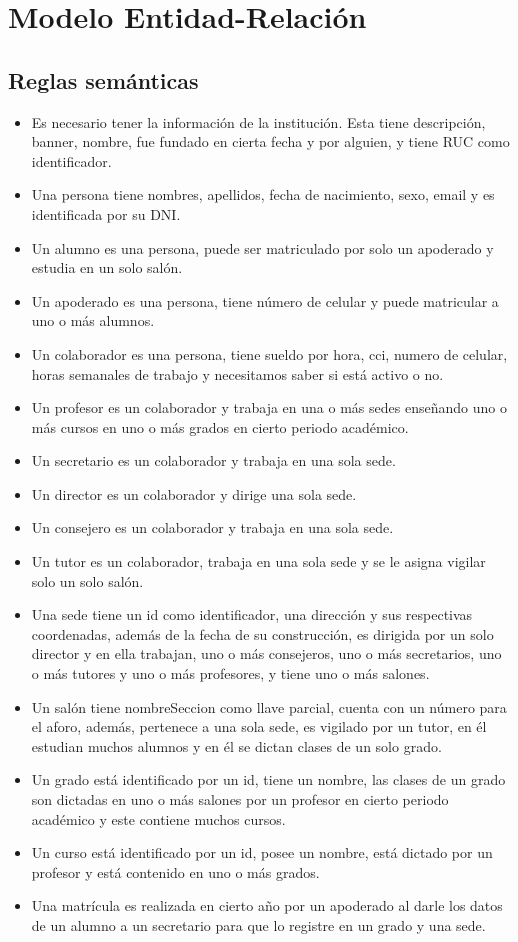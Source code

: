 \section{Modelo Entidad-Relación}
\subsection{Reglas semánticas}
\begin{itemize}
	\item Es necesario tener la información de la institución. Esta tiene descripción, banner, nombre, fue fundado en cierta fecha y por alguien, y tiene RUC como identificador.
	\item Una persona tiene nombres, apellidos, fecha de nacimiento, sexo, email y es identificada por su DNI.
	\item Un alumno es una persona, puede ser matriculado por solo un apoderado y estudia en un solo salón.
	\item Un apoderado es una persona, tiene número de celular y puede matricular a uno o más alumnos.
	\item Un colaborador es una persona, tiene sueldo por hora, cci, numero de celular, horas semanales de trabajo y necesitamos saber si está activo o no.
	\item Un profesor es un colaborador y trabaja en una o más sedes enseñando uno o más cursos en uno o más grados en cierto periodo académico.
	\item Un secretario es un colaborador y trabaja en una sola sede.
	\item Un director es un colaborador y dirige una sola sede.
	\item Un consejero es un colaborador y trabaja en una sola sede.
	\item Un tutor es un colaborador, trabaja en una sola sede y se le asigna vigilar solo un solo salón.
	\item Una sede tiene un id como identificador, una dirección y sus respectivas coordenadas, además de la fecha de su construcción, es dirigida por un solo director y en ella trabajan, uno o más consejeros, uno o más secretarios, uno o más tutores y uno o más profesores, y tiene uno o más salones.
	\item Un salón tiene nombreSeccion como llave parcial, cuenta con un número para el aforo, además, pertenece a una sola sede, es vigilado por un tutor, en él estudian muchos alumnos y en él se dictan clases de un solo grado.
	\item Un grado está identificado por un id, tiene un nombre, las clases de un grado son dictadas en uno o más salones por un profesor en cierto periodo académico y este contiene muchos cursos.
	\item Un curso está identificado por un id, posee un nombre, está dictado por un profesor y está contenido en uno o más grados.
	\item  Una matrícula es realizada en cierto año por un apoderado al darle los datos de un alumno a un secretario para que lo registre en un grado y una sede.
\end{itemize}
